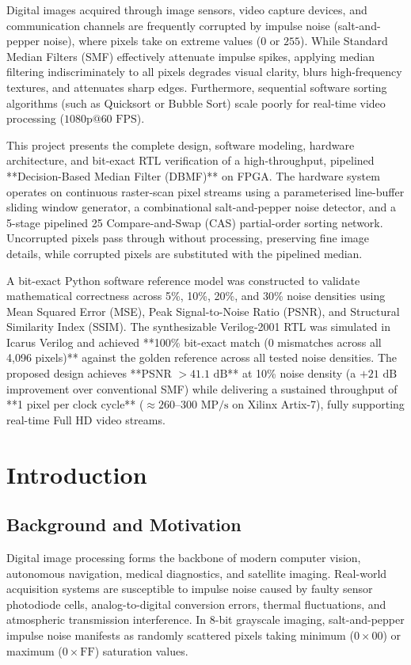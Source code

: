 \documentclass[12pt,a4paper]{article}
\begin{document}
Digital images acquired through image sensors, video capture devices, and communication channels are frequently corrupted by impulse noise (salt-and-pepper noise), where pixels take on extreme values ($0$ or $255$). While Standard Median Filters (SMF) effectively attenuate impulse spikes, applying median filtering indiscriminately to all pixels degrades visual clarity, blurs high-frequency textures, and attenuates sharp edges. Furthermore, sequential software sorting algorithms (such as Quicksort or Bubble Sort) scale poorly for real-time video processing ($1080\text{p} @ 60\text{ FPS}$).

This project presents the complete design, software modeling, hardware architecture, and bit-exact RTL verification of a high-throughput, pipelined **Decision-Based Median Filter (DBMF)** on FPGA. The hardware system operates on continuous raster-scan pixel streams using a parameterised line-buffer sliding window generator, a combinational salt-and-pepper noise detector, and a 5-stage pipelined 25 Compare-and-Swap (CAS) partial-order sorting network. Uncorrupted pixels pass through without processing, preserving fine image details, while corrupted pixels are substituted with the pipelined median.

A bit-exact Python software reference model was constructed to validate mathematical correctness across 5\%, 10\%, 20\%, and 30\% noise densities using Mean Squared Error (MSE), Peak Signal-to-Noise Ratio (PSNR), and Structural Similarity Index (SSIM). The synthesizable Verilog-2001 RTL was simulated in Icarus Verilog and achieved **100\% bit-exact match (0 mismatches across all 4,096 pixels)** against the golden reference across all tested noise densities. The proposed design achieves **PSNR $> 41.1\text{ dB}$** at 10\% noise density (a $+21\text{ dB}$ improvement over conventional SMF) while delivering a sustained throughput of **1 pixel per clock cycle** ($\approx 260\text{--}300\text{ MP/s}$ on Xilinx Artix-7), fully supporting real-time Full HD video streams.

\newpage
\tableofcontents
\newpage

\section{Introduction}

\subsection{Background and Motivation}
Digital image processing forms the backbone of modern computer vision, autonomous navigation, medical diagnostics, and satellite imaging. Real-world acquisition systems are susceptible to impulse noise caused by faulty sensor photodiode cells, analog-to-digital conversion errors, thermal fluctuations, and atmospheric transmission interference. In 8-bit grayscale imaging, salt-and-pepper impulse noise manifests as randomly scattered pixels taking minimum ($0\times00$) or maximum ($0\times\text{FF}$) saturation values.
\end{document}
